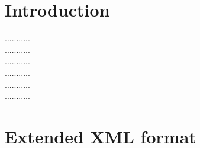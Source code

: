 \documentclass[submission, Phys]{SciPost}
\begin{document}


\section{Introduction} \label{sec:intro}

...........\\
...........\\
...........\\
...........\\
...........\\
...........\\


\clearpage
\section{Extended XML format} \label{sec:intro}
\end{document}
